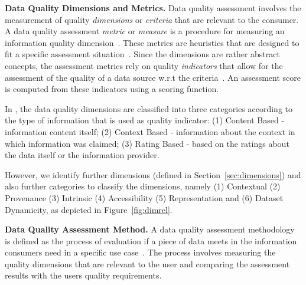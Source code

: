 \textbf{Data Quality Dimensions and Metrics.}
Data quality assessment involves the measurement of quality \textit{dimensions} or \textit{criteria} that are relevant to the consumer.
A data quality assessment \textit{metric} or \textit{measure} is a procedure for measuring an information quality dimension~\cite{Bizer}. 
These metrics are heuristics that are designed to fit a specific assessment situation~\cite{metric}.
Since the dimensions are rather abstract concepts, the assessment metrics rely on quality \textit{indicators} that allow for the assessment of the quality of a data source w.r.t the criteria~\cite{Flemming}.
An assessment score is computed from these indicators using a scoring function. 

In \cite{Bizer}, the data quality dimensions are classified into three categories according to the type of information that is used as quality indicator: (1) Content Based - information content itself; (2) Context Based - information about the context in which information was claimed; (3) Rating Based - based on the ratings about the data itself or the information provider. 

However, we identify further dimensions (defined in Section~\ref{sec:dimensions}) and also further categories to classify the dimensions, namely (1) Contextual (2) Provenance (3) Intrinsic (4) Accessibility (5) Representation and (6) Dataset Dynamicity, as depicted in Figure~\ref{fig:dimrel}.

\textbf{Data Quality Assessment Method.}
A data quality assessment methodology is defined as the process of evaluation if a piece of data meets in the information consumers need in a specific use case~\cite{Bizer}.
The process involves measuring the quality dimensions that are relevant to the user and comparing the assessment results with the users quality requirements.


